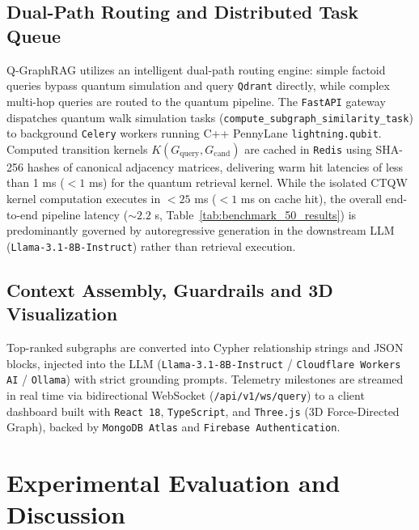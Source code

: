 \documentclass{llncs}
\begin{document}
\subsection{Dual-Path Routing and Distributed Task Queue}
Q-GraphRAG utilizes an intelligent dual-path routing engine: simple factoid queries bypass quantum simulation and query \texttt{Qdrant} directly, while complex multi-hop queries are routed to the quantum pipeline. The \texttt{FastAPI} gateway dispatches quantum walk simulation tasks (\texttt{compute\_subgraph\_similarity\_task}) to background \texttt{Celery} workers running C++ PennyLane \texttt{lightning.qubit}. Computed transition kernels $K(G_{\text{query}}, G_{\text{cand}})$ are cached in \texttt{Redis} using SHA-256 hashes of canonical adjacency matrices, delivering warm hit latencies of less than 1 ms ($< 1$ ms) for the quantum retrieval kernel. While the isolated CTQW kernel computation executes in $<25$ ms ($<1$ ms on cache hit), the overall end-to-end pipeline latency ($\sim 2.2$ s, Table~\ref{tab:benchmark_50_results}) is predominantly governed by autoregressive generation in the downstream LLM (\texttt{Llama-3.1-8B-Instruct}) rather than retrieval execution.

\subsection{Context Assembly, Guardrails and 3D Visualization}
Top-ranked subgraphs are converted into Cypher relationship strings and JSON blocks, injected into the LLM (\texttt{Llama-3.1-8B-Instruct} / \texttt{Cloudflare Workers AI} / \texttt{Ollama}) with strict grounding prompts. Telemetry milestones are streamed in real time via bidirectional WebSocket (\texttt{/api/v1/ws/query}) to a client dashboard built with \texttt{React 18}, \texttt{TypeScript}, and \texttt{Three.js} (3D Force-Directed Graph), backed by \texttt{MongoDB Atlas} and \texttt{Firebase Authentication}.

\section{Experimental Evaluation and Discussion}\label{sec:experimental_evaluation}
\end{document}

